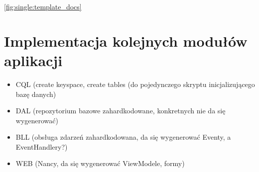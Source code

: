 \ref{fig:single:template_docs}




\section{Implementacja kolejnych modułów aplikacji}

\begin{itemize}
 \item CQL (create keyspace, create tables (do pojedynczego skryptu inicjalizującego bazę danych)
 \item DAL (repozytorium bazowe zahardkodowane, konkretnych nie da się wygenerować)
 \item BLL (obsługa zdarzeń zahardkodowana, da się wygenerować Eventy, a EventHandlery?)
 \item WEB (Nancy, da się wygenerować ViewModele, formy)
\end{itemize}

